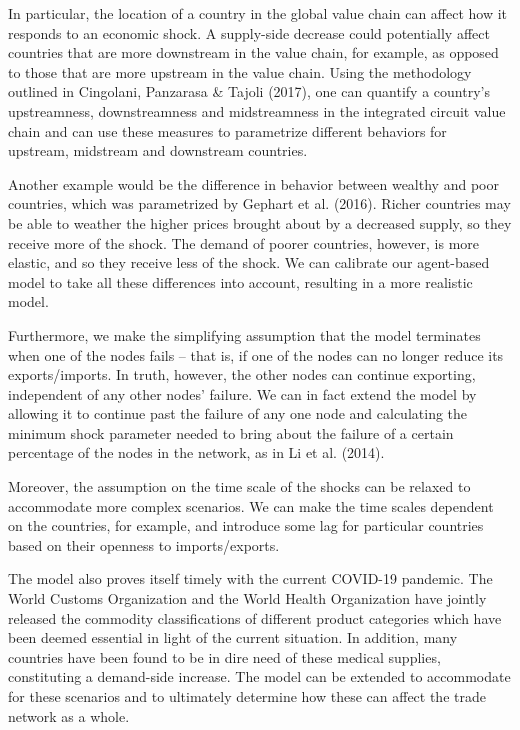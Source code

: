 \documentclass[12pt,letterpaper]{report}
\begin{document}
In particular, the location of a country in the global value chain can affect how it responds to an economic shock. A supply-side decrease could potentially affect countries that are more downstream in the value chain, for example, as opposed to those that are more upstream in the value chain. Using the methodology outlined in Cingolani, Panzarasa \& Tajoli (2017), one can quantify a country's upstreamness, downstreamness and midstreamness in the integrated circuit value chain and can use these measures to parametrize different behaviors for upstream, midstream and downstream countries.

Another example would be the difference in behavior between wealthy and poor countries, which was parametrized by Gephart et al. (2016). Richer countries may be able to weather the higher prices brought about by a decreased supply, so they receive more of the shock. The demand of poorer countries, however, is more elastic, and so they receive less of the shock. We can calibrate our agent-based model to take all these differences into account, resulting in a more realistic model.

Furthermore, we make the simplifying assumption that the model terminates when one of the nodes fails – that is, if one of the nodes can no longer reduce its exports/imports. In truth, however, the other nodes can continue exporting, independent of any other nodes' failure. We can in fact extend the model by allowing it to continue past the failure of any one node and calculating the minimum shock parameter needed to bring about the failure of a certain percentage of the nodes in the network, as in Li et al. (2014).

Moreover, the assumption on the time scale of the shocks can be relaxed to accommodate more complex scenarios. We can make the time scales dependent on the countries, for example, and introduce some lag for particular countries based on their openness to imports/exports. \cite{losercs224w}

The model also proves itself timely with the current COVID-19 pandemic. The World Customs Organization and the World Health Organization have jointly released the commodity classifications of different product categories which have been deemed essential in light of the current situation. In addition, many countries have been found to be in dire need of these medical supplies, constituting a demand-side increase. The model can be extended to accommodate for these scenarios and to ultimately determine how these can affect the trade network as a whole. 
\end{document}
